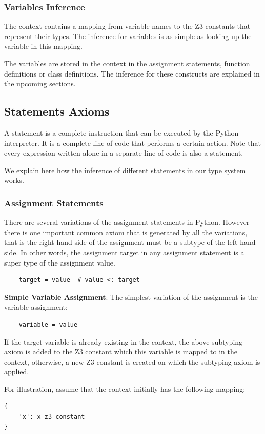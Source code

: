 \subsubsection{Variables Inference}
The context contains a mapping from variable names to the Z3 constants that represent their types. The inference for variables is as simple as looking up the variable in this mapping.

The variables are stored in the context in the assignment statements, function definitions or class definitions. The inference for these constructs are explained in the upcoming sections.

\subsection{Statements Axioms}
A statement is a complete instruction that can be executed by the Python interpreter. It is a complete line of code that performs a certain action. Note that every expression written alone in a separate line of code is also a statement.

We explain here how the inference of different statements in our type system works.

\subsubsection{Assignment Statements}
There are several variations of the assignment statements in Python. However there is one important common axiom that is generated by all the variations, that is the right-hand side of the assignment must be a subtype of the left-hand side. In other words, the assignment target in any assignment statement is a super type of the assignment value.

\begin{lstlisting}
	target = value  # value <: target
\end{lstlisting}


\textbf{Simple Variable Assignment}: The simplest variation of the assignment is the variable assignment:
\begin{lstlisting}
	variable = value
\end{lstlisting}

If the target variable is already existing in the context, the above subtyping axiom is added to the Z3 constant which this variable is mapped to in the context, otherwise, a new Z3 constant is created on which the subtyping axiom is applied.

For illustration, assume that the context initially has the following mapping:
\begin{lstlisting}
{
	'x': x_z3_constant
}
\end{lstlisting}

